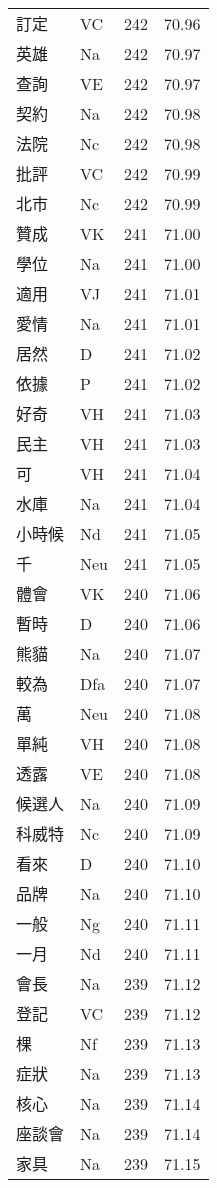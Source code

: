 \documentclass[twocolumn]{book}
\begin{document}
\begin{supertabular}{llrr}
訂定 & VC & 242 &  70.96\\
英雄 & Na & 242 &  70.97\\
查詢 & VE & 242 &  70.97\\
契約 & Na & 242 &  70.98\\
法院 & Nc & 242 &  70.98\\
批評 & VC & 242 &  70.99\\
北市 & Nc & 242 &  70.99\\
贊成 & VK & 241 &  71.00\\
學位 & Na & 241 &  71.00\\
適用 & VJ & 241 &  71.01\\
愛情 & Na & 241 &  71.01\\
居然 & D & 241 &  71.02\\
依據 & P & 241 &  71.02\\
好奇 & VH & 241 &  71.03\\
民主 & VH & 241 &  71.03\\
可 & VH & 241 &  71.04\\
水庫 & Na & 241 &  71.04\\
小時候 & Nd & 241 &  71.05\\
千 & Neu & 241 &  71.05\\
體會 & VK & 240 &  71.06\\
暫時 & D & 240 &  71.06\\
熊貓 & Na & 240 &  71.07\\
較為 & Dfa & 240 &  71.07\\
萬 & Neu & 240 &  71.08\\
單純 & VH & 240 &  71.08\\
透露 & VE & 240 &  71.08\\
候選人 & Na & 240 &  71.09\\
科威特 & Nc & 240 &  71.09\\
看來 & D & 240 &  71.10\\
品牌 & Na & 240 &  71.10\\
一般 & Ng & 240 &  71.11\\
一月 & Nd & 240 &  71.11\\
會長 & Na & 239 &  71.12\\
登記 & VC & 239 &  71.12\\
棵 & Nf & 239 &  71.13\\
症狀 & Na & 239 &  71.13\\
核心 & Na & 239 &  71.14\\
座談會 & Na & 239 &  71.14\\
家具 & Na & 239 &  71.15\\

\end{supertabular}
\end{document}
